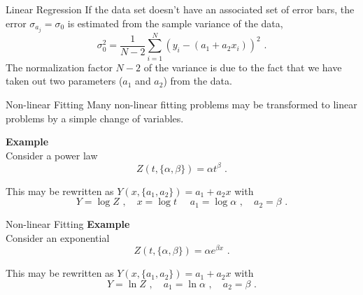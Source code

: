 \documentclass[11pt]{beamer}
\begin{document}
\begin{frame}[fragile]{Linear Regression}
If the data set doesn't have an associated set of error bars, the error
 $\sigma_{a_j} = \sigma_0$ is estimated from the sample variance of the data,
\begin{equation}
\sigma_0^2 = \frac{1}{N-2} \sum_{i=1}^N \left(y_i - (a_1 + a_2 x_i) \right)^2\,\,.
\end{equation}
The normalization factor $N-2$ of the variance is due to the fact that
we have taken out two parameters ($a_1$ and $a_2$) from the
data.
\end{frame}

\begin{frame}[fragile]{Non-linear Fitting}
Many non-linear fitting problems may be transformed to linear
problems by a simple change of variables. \\
\bigskip

\textbf{Example}\\ 
Consider a power law
\begin{equation}
Z(t, \{\alpha,\beta\}) = \alpha t^{\beta}\,\,.
\end{equation}

This may be rewritten as $Y(x, \{a_1,a_2\}) = a_1 + a_2 x$ with
\begin{equation}
Y = \log Z\,\,,\hspace{1em} x = \log t\,\,\hspace{1em} a_1 = \log
\alpha\,\,,\hspace{1em} a_2 = \beta\,\,.
\end{equation}
\end{frame}

\begin{frame}[fragile]{Non-linear Fitting}
\textbf{Example}\\
Consider an exponential
\begin{equation}
Z(t, \{\alpha, \beta\}) = \alpha e^{\beta x}\,\,.
\end{equation}

This may be rewritten as $Y(x, \{a_1,a_2\}) = a_1 + a_2 x$ with
\begin{equation}
Y = \ln Z\,\,,\hspace{1em} a_1 = \ln
\alpha\,\,,\hspace{1em} a_2 = \beta\,\,.
\end{equation}
\end{frame}
\end{document}
